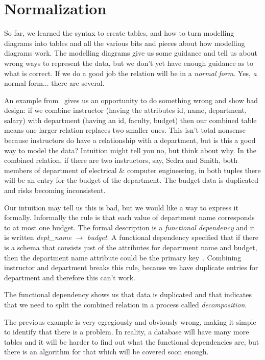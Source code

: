 




\section*{Normalization}
So far, we learned the syntax to create tables, and how to turn modelling diagrams into tables and all the various bits and pieces about how modelling diagrams work. The modelling diagrams give us some guidance and tell us about wrong ways to represent the data, but we don't yet have enough guidance as to what is correct. If we do a good job the relation will be in a \textit{normal form}. Yes, \textit{a} normal form... there are several.

An example from~\cite{dsc} gives us an opportunity to do something wrong and show bad design: if we combine instructor (having the attributes id, name, department, salary) with department (having an id, faculty, budget) then our combined table means one larger relation replaces two smaller ones. This isn't total nonsense because instructors do have a relationship with a department, but is this a good way to model the data? Intuition might tell you no, but think about why. In the combined relation, if there are two instructors, say, Sedra and Smith, both members of department of electrical \& computer engineering, in both tuples there will be an entry for the budget of the department. The budget data is duplicated and risks becoming inconsistent.

Our intuition may tell us this is bad, but we would like a way to express it formally. Informally the rule is that each value of department name corresponds to at most one budget. The formal description is a \textit{functional dependency} and it is written \textit{dept\_name} $\rightarrow$ \textit{budget}. A functional dependency specified that if there is a schema that consists just of the attributes for department name and budget, then the department name attribute could be the primary key~\cite{dsc}. Combining instructor and department breaks this rule, because we have duplicate entries for department and therefore this can't work.

The functional dependency shows us that data is duplicated and that indicates that we need to split the combined relation in a process called \textit{decomposition}.

The previous example is very egregiously and obviously wrong, making it simple to identify that there is a problem. In reality, a database will have many more tables and it will be harder to find out what the functional dependencies are, but there is an algorithm for that which will be covered soon enough.


